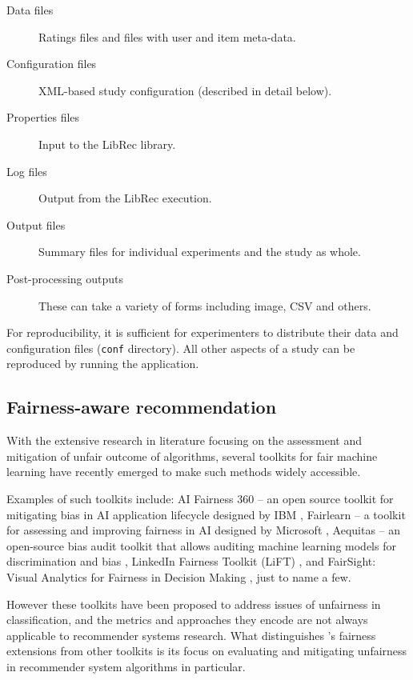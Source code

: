 \begin{description}
    \item[Data files] Ratings files and files with user and item meta-data.
    \item[Configuration files] XML-based study configuration (described in detail below).
    \item[Properties files] Input to the LibRec library.
    \item[Log files] Output from the LibRec execution.
    \item[Output files] Summary files for individual experiments and the study as whole.
    \item[Post-processing outputs] These can take a variety of forms including image, CSV and others.
\end{description}

For reproducibility, it is sufficient for experimenters to distribute their data and configuration files (\texttt{conf} directory). All other aspects of a study can be reproduced by running the \libauto{} application.

\subsection{Fairness-aware recommendation}
\label{subsec:libauto_fair_tools}

With the extensive research in literature focusing on the assessment and mitigation of unfair outcome of algorithms, several toolkits for fair machine learning have recently emerged to make such methods widely accessible.

Examples of such toolkits include: AI Fairness 360 -- an open source toolkit for mitigating bias in AI application lifecycle designed by IBM \cite{bellamy2019ai}, Fairlearn -- a toolkit for assessing and improving fairness in AI designed by Microsoft \cite{bird2020fairlearn}, Aequitas -- an open-source bias audit toolkit that allows auditing machine learning models for discrimination and bias \cite{saleiro2018aequitas}, LinkedIn Fairness Toolkit (LiFT) \cite{SriramLifT2020}, and FairSight: Visual Analytics for Fairness in Decision Making \cite{ahn2019fairsight}, just to name a few.


However these toolkits have been proposed to address issues of unfairness in classification, and the metrics and approaches they encode are not always applicable to recommender systems research. What distinguishes \libauto{}'s fairness extensions from other toolkits is its focus on evaluating and mitigating unfairness in recommender system algorithms in particular.

